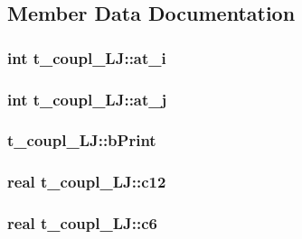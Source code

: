 \subsection{\-Member \-Data \-Documentation}
\hypertarget{structt__coupl__LJ_a0d27b5f93c3c6cd3b95bde3553d1dbb3}{
\subsubsection[{at\-\_\-i}]{\setlength{\rightskip}{0pt plus 5cm}int {\bf t\-\_\-coupl\-\_\-\-L\-J\-::at\-\_\-i}}}\label{structt__coupl__LJ_a0d27b5f93c3c6cd3b95bde3553d1dbb3}
\hypertarget{structt__coupl__LJ_a84a8eada1e553224b1848f08c2dddfc6}{
\subsubsection[{at\-\_\-j}]{\setlength{\rightskip}{0pt plus 5cm}int {\bf t\-\_\-coupl\-\_\-\-L\-J\-::at\-\_\-j}}}\label{structt__coupl__LJ_a84a8eada1e553224b1848f08c2dddfc6}
\hypertarget{structt__coupl__LJ_a69ac1dd094b4c2f3c0b5a0a058287ff3}{
\subsubsection[{b\-Print}]{ {\bf t\-\_\-coupl\-\_\-\-L\-J\-::b\-Print}}}\label{structt__coupl__LJ_a69ac1dd094b4c2f3c0b5a0a058287ff3}
\hypertarget{structt__coupl__LJ_a9e7b068daf3358ea9358704e077c275c}{
\subsubsection[{c12}]{\setlength{\rightskip}{0pt plus 5cm}real {\bf t\-\_\-coupl\-\_\-\-L\-J\-::c12}}}\label{structt__coupl__LJ_a9e7b068daf3358ea9358704e077c275c}
\hypertarget{structt__coupl__LJ_ab5d4149e9e165be3cd4f748443f4acd2}{
\subsubsection[{c6}]{\setlength{\rightskip}{0pt plus 5cm}real {\bf t\-\_\-coupl\-\_\-\-L\-J\-::c6}}}\label{structt__coupl__LJ_ab5d4149e9e165be3cd4f748443f4acd2}
